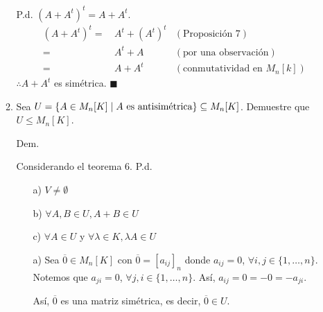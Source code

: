\documentclass[fleqn]{article}
\begin{document}
\begin{enumerate}
\begin{enumerate}
            P.d. $ (A + A^t)^t = A + A^t $.
            \begin{align*}
                (A + A^t)^t =& \, A^t + (A^t)^t & (\text{Proposición 7}) \\
                =& \, A^t + A & (\text{por una observación}) \\
                =& \, A + A^t & (\text{conmutatividad en } M_n[k])
            \end{align*}
            $ \therefore A + A^t $ es simétrica. $ \blacksquare $

            \item Sea $ U = \left \{A \in M_n [K] \; \middle \arrowvert \; A \text{ es antisimétrica} \right \} \subseteq M_n [K] $. Demuestre que $ U \leq M_n[K] $. \par
            
            \hspace{2.7mm}  Dem. \par

            \begin{minipage}[c]{5cm}
                \vspace{-1.7cm} Considerando el teorema 6. P.d. 
            \end{minipage} \begin{minipage}[b]{6cm}
                \begin{enumerate}
                    \item[a)] $ V \neq \emptyset $
                    \item[b)] $ \forall A, B \in U, A + B \in U $
                    \item[c)] $ \forall A \in U $ y $ \forall \lambda \in K, \lambda A \in U $
                \end{enumerate}
            \end{minipage}

            \begin{enumerate}
                \item[a)] Sea $ \overline{0} \in M_n [K] $ con $ \overline{0} = [a_{ij}]_n $ donde $ a_{ij} = 0 $, $ \forall i, j \in \{1, \ldots, n\} $. Notemos que $ a_{ji} = 0 $, $ \forall j, i \in \{1, \ldots, n\} $. Así, $ a_{ij} = 0 = -0 = -a_{ji} $. \par 
                
                Así, $ \overline{0} $ es una matriz simétrica, es decir, $ \overline{0} \in U $. \par


\end{enumerate}
\end{enumerate}
\end{enumerate}
\end{document}
